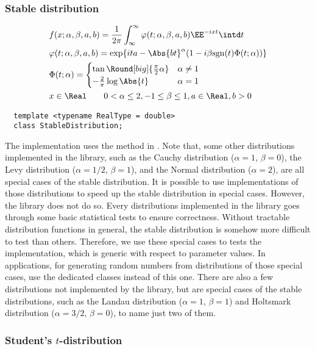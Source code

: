 \subsubsection{Stable distribution}
\begin{align*}
  &f(x;\alpha,\beta,a,b) = \frac{1}{2\pi}\int_{\infty}^{\infty}
  \varphi(t;\alpha,\beta,a,b)\EE^{-ixt}\intd t\\
  &\varphi(t;\alpha,\beta,a,b) = \exp\{ita - \Abs{bt}^{\alpha}(1 -
  i\beta\mathrm{sgn}(t)\Phi(t;\alpha))\} \\
  &\Phi(t;\alpha) = \begin{cases}
    \tan\Round[big]{\frac{\pi}{2}\alpha} & \alpha \ne 1 \\
    -\frac{2}{\pi}\log\Abs{t}            & \alpha = 1
  \end{cases} \\
  & x \in \Real \qquad 0 < \alpha \le 2, -1 \le \beta \le 1, a \in \Real, b > 0
\end{align*}
\begin{Verbatim}
  template <typename RealType = double>
  class StableDistribution;
\end{Verbatim}
The implementation uses the method in \textcite{Chambers:1976dv}. Note that,
some other distributions implemented in the library, such as the Cauchy
distribution ($\alpha = 1$, $\beta = 0$), the Levy distribution ($\alpha =
1/2$, $\beta = 1$), and the Normal distribution ($\alpha = 2$), are all special
cases of the stable distribution. It is possible to use implementations of
those distributions to speed up the stable distribution in special cases.
However, the library does not do so. Every distributions implemented in the
library goes through some basic statistical tests to ensure correctness.
Without tractable distribution functions in general, the stable distribution is
somehow more difficult to test than others. Therefore, we use these special
cases to tests the implementation, which is generic with respect to parameter
values. In applications, for generating random numbers from distributions of
those special cases, use the dedicated classes instead of this one. There are
also a few distributions not implemented by the library, but are special cases
of the stable distributions, such as the Landau distribution ($\alpha = 1$,
$\beta = 1$) and Holtsmark distribution ($\alpha = 3/2$, $\beta = 0$), to name
just two of them.

\subsubsection{Student's $t$-distribution}

